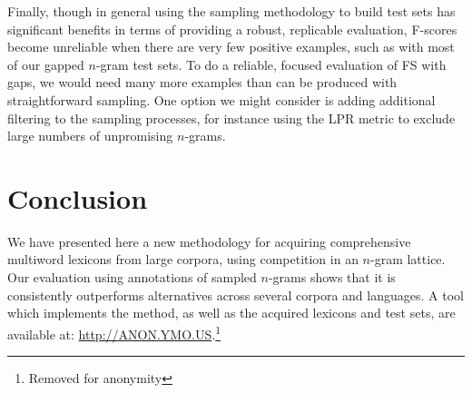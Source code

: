 \documentclass[11pt,letterpaper]{article}
\begin{document}

Finally, though in general using the sampling methodology to build test sets has significant benefits in terms of providing a robust, replicable evaluation, F-scores become unreliable when there are very few positive examples, such as with most of our gapped $n$-gram test sets. To do a reliable, focused evaluation of FS with gaps, we would need many more examples than can be produced with straightforward sampling. One option we might consider is adding additional filtering to the sampling processes, for instance using the LPR metric to exclude large numbers of unpromising $n$-grams.

\section{Conclusion}

We have presented here a new methodology for acquiring comprehensive multiword lexicons from large corpora, using competition in an $n$-gram lattice. Our evaluation using annotations of sampled $n$-grams shows that it is consistently outperforms alternatives across several corpora and languages. A tool which implements the method, as well as the acquired lexicons and test sets, are available at: \url{http://ANON.YMO.US}.\footnote{Removed for anonymity} 




\end{document}
